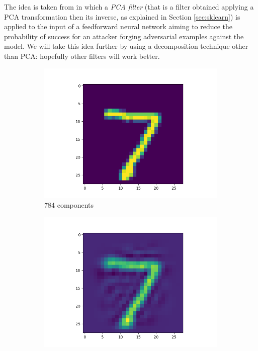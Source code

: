 The idea is taken from \cite{bhagoji2018enhancing} in which a \emph{PCA
  filter} (that is a filter obtained applying a PCA transformation then
its inverse, as explained in Section \ref{sec:sklearn}) is applied to
the input of a feedforward neural network aiming to reduce the
probability of success for an attacker forging adversarial examples
against the model. We will take this idea further by using a
decomposition technique other than PCA: hopefully other filters will
work better.

\begin{figure}
  \centering
  \begin{subfigure}{0.3\linewidth}
    \includegraphics[width=\linewidth]{filtered-input-pca-784-components.png}
    \caption{784 components}
  \end{subfigure}
  \begin{subfigure}{0.3\linewidth}
    \includegraphics[width=\linewidth]{filtered-input-pca-100-components.png}

\end{subfigure}
\end{figure}
